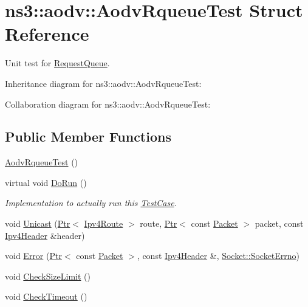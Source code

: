 \hypertarget{structns3_1_1aodv_1_1AodvRqueueTest}{}\section{ns3\+:\+:aodv\+:\+:Aodv\+Rqueue\+Test Struct Reference}
\label{structns3_1_1aodv_1_1AodvRqueueTest}


Unit test for \hyperlink{classns3_1_1aodv_1_1RequestQueue}{Request\+Queue}.  




Inheritance diagram for ns3\+:\+:aodv\+:\+:Aodv\+Rqueue\+Test\+:


Collaboration diagram for ns3\+:\+:aodv\+:\+:Aodv\+Rqueue\+Test\+:
\subsection*{Public Member Functions}
\begin{DoxyCompactItemize}
\item 
\hyperlink{structns3_1_1aodv_1_1AodvRqueueTest_a5ed8d820b4f25d9303f4fc5dd4b7d212}{Aodv\+Rqueue\+Test} ()
\item 
virtual void \hyperlink{structns3_1_1aodv_1_1AodvRqueueTest_a7ec6b59547d19f9c08f2dcff06eecae3}{Do\+Run} ()
\begin{DoxyCompactList}\small\item\em Implementation to actually run this \hyperlink{classns3_1_1TestCase}{Test\+Case}. \end{DoxyCompactList}\item 
void \hyperlink{structns3_1_1aodv_1_1AodvRqueueTest_a23ba3e5a2542c36e15bccc6fd88275ac}{Unicast} (\hyperlink{classns3_1_1Ptr}{Ptr}$<$ \hyperlink{classns3_1_1Ipv4Route}{Ipv4\+Route} $>$ route, \hyperlink{classns3_1_1Ptr}{Ptr}$<$ const \hyperlink{classns3_1_1Packet}{Packet} $>$ packet, const \hyperlink{classns3_1_1Ipv4Header}{Ipv4\+Header} \&header)
\item 
void \hyperlink{structns3_1_1aodv_1_1AodvRqueueTest_a1ea3a1c5bbaa3255968701d98a0933fe}{Error} (\hyperlink{classns3_1_1Ptr}{Ptr}$<$ const \hyperlink{classns3_1_1Packet}{Packet} $>$, const \hyperlink{classns3_1_1Ipv4Header}{Ipv4\+Header} \&, \hyperlink{classns3_1_1Socket_ada1328c5ae0c28cb2a982caf8f6d6cca}{Socket\+::\+Socket\+Errno})
\item 
void \hyperlink{structns3_1_1aodv_1_1AodvRqueueTest_aa9ce570206331dbac430dcca56c890f3}{Check\+Size\+Limit} ()
\item 
void \hyperlink{structns3_1_1aodv_1_1AodvRqueueTest_a3e948c8e80d4fc78e261fd47f5f9a0d9}{Check\+Timeout} ()
\end{DoxyCompactItemize}
